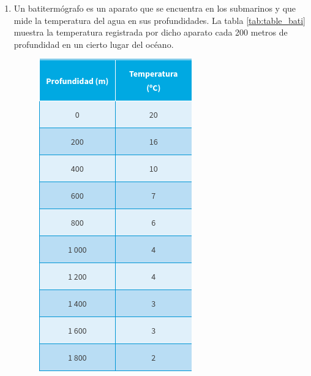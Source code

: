 \documentclass[11pt]{book}
\begin{document}
\begin{enumerate}
        \newpage
  \item Un batitermógrafo es un aparato que se encuentra en los submarinos y que mide la temperatura del
        agua en sus profundidades. La tabla \ref{tab:table_bati} muestra la temperatura registrada por dicho aparato cada 200 metros
        de profundidad en un cierto lugar del océano.\\
        \begin{minipage}[t]{0.35\linewidth}
          \begin{figure}[H]
            \centering
            \includegraphics[width=\linewidth]{table_bati.jpg}

\end{figure}
\end{minipage}
\end{enumerate}
\end{document}
